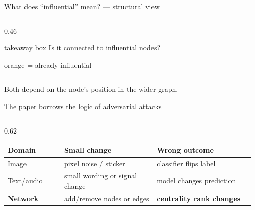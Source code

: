 \begin{frame}{What does ``influential'' mean? --- structural view}
\begin{columns}[T,onlytextwidth]
\begin{column}{0.46\textwidth}
\begin{beamercolorbox}[wd=\linewidth,rounded=true,sep=0.70em]{takeaway box}
        {\small Is it connected to influential nodes?}\par
        {\tiny\color{PresFourAccent}orange = already influential}
      \end{beamercolorbox}
    \end{column}
  \end{columns}
  \vfill
  {\small\color{PresFourMuted}Both depend on the node's position in the wider graph.}
\end{frame}

\begin{frame}{The paper borrows the logic of adversarial attacks}
  \begin{columns}[T,onlytextwidth]
    \begin{column}{0.62\textwidth}
      \small
      \begin{tabular}{@{}>{\raggedright\arraybackslash}p{0.22\linewidth}>{\raggedright\arraybackslash}p{0.36\linewidth}>{\raggedright\arraybackslash}p{0.38\linewidth}@{}}
        \toprule
        \textbf{Domain} & \textbf{Small change} & \textbf{Wrong outcome} \\
        \midrule
        Image      & pixel noise / sticker          & classifier flips label \\
        \addlinespace[3pt]
        Text/audio & small wording or signal change & model changes prediction \\
        \addlinespace[3pt]
        \textbf{Network} & add/remove nodes or edges & \textbf{centrality rank changes} \\
        \bottomrule
      \end{tabular}
      \vspace{0.8em}


\end{column}
\end{columns}
\end{frame}
